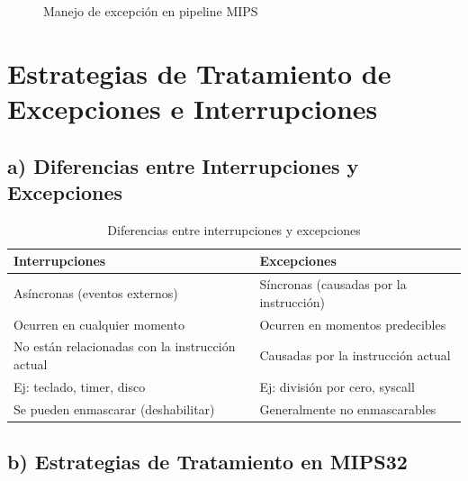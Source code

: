 \documentclass[12pt,a4paper]{article}
\begin{document}
\begin{figure}[H]
\centering
{}
\caption{Manejo de excepción en pipeline MIPS}
\end{figure}

\section{Estrategias de Tratamiento de Excepciones e Interrupciones}

\subsection{a) Diferencias entre Interrupciones y Excepciones}

\begin{table}[H]
\centering
\begin{tabular}{|l|l|}
\hline
\textbf{Interrupciones} & \textbf{Excepciones} \\
\hline
Asíncronas (eventos externos) & Síncronas (causadas por la instrucción) \\
\hline
Ocurren en cualquier momento & Ocurren en momentos predecibles \\
\hline
No están relacionadas con la instrucción actual & Causadas por la instrucción actual \\
\hline
Ej: teclado, timer, disco & Ej: división por cero, syscall \\
\hline
Se pueden enmascarar (deshabilitar) & Generalmente no enmascarables \\
\hline
\end{tabular}
\caption{Diferencias entre interrupciones y excepciones}
\end{table}

\subsection{b) Estrategias de Tratamiento en MIPS32}
\end{document}

